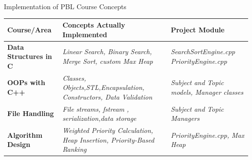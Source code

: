 \documentclass[aspectratio=169,11pt]{beamer}
\newcommand{\placeholder}[1]{%
\textit{\color{GEUGrey}#1}
}
\begin{document}
\begin{frame}{Implementation of PBL Course Concepts}

\scriptsize

\begin{center}

\renewcommand{\arraystretch}{1.25}

\begin{tabularx}{.96\textwidth}
{@{}>{\bfseries}p{3.0cm}X p{2.5cm}@{}}

\toprule
Course/Area & Concepts Actually Implemented & Project Module\\
\midrule

Data Structures in C &
\placeholder{Linear Search, Binary Search, Merge Sort, custom Max Heap} &
\placeholder{SearchSortEngine.cpp PriorityEngine.cpp}\\

OOPs with C++ &
\placeholder{Classes, Objects,STL,Encapsulation, Constructors, Data Validation} &
\placeholder{Subject and Topic models, Manager classes}\\

File Handling &
\placeholder{File streams, fstream , serialization,data storage} &
\placeholder{Subject and Topic Managers}\\

Algorithm Design &
\placeholder{Weighted Priority Calculation, Heap Insertion, Priority-Based Ranking} &
\placeholder{PriorityEngine.cpp, Max Heap}\\

\midrule


\bottomrule

\end{tabularx}

\end{center}

\vfill




\end{frame}
\end{document}
